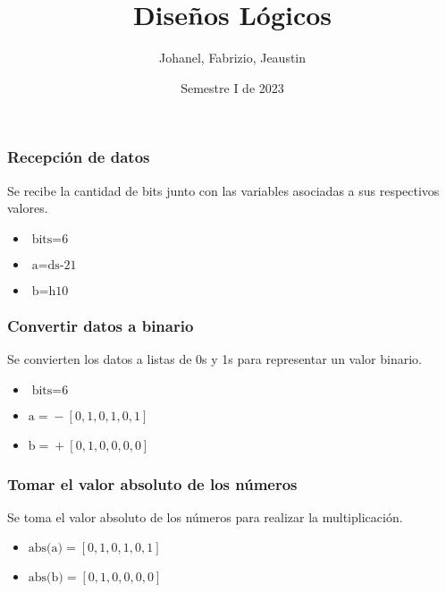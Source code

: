 \documentclass{beamer}
\title{Diseños Lógicos}
\author{Johanel, Fabrizio, Jeaustin}
\institute{Tecnológico de Costa Rica}
\date{Semestre I de 2023}
\begin{document}
\begin{frame}
\frametitle{Recepción de datos}
Se recibe la cantidad de bits junto con las variables asociadas a sus respectivos valores.
\begin{itemize}
\item $\text{bits} = \text{6}$
\item $\text{a} = \text{ds-21}$
\item $\text{b} = \text{h10}$
\end{itemize}
\end{frame}
\begin{frame}
\frametitle{Convertir datos a binario}
Se convierten los datos a listas de 0s y 1s para representar un valor binario.
\begin{itemize}
\item $\text{bits} = \text{6}$
\item $\text{a} = \text{} - [0, 1, 0, 1, 0, 1]$
\item $\text{b} = \text{} + [0, 1, 0, 0, 0, 0]$
\end{itemize}
\end{frame}
\begin{frame}
\frametitle{Tomar el valor absoluto de los números}
Se toma el valor absoluto de los números para realizar la multiplicación.
\begin{itemize}
\item $\text{abs(a)} = [0, 1, 0, 1, 0, 1]$
\item $\text{abs(b)} = [0, 1, 0, 0, 0, 0]$
\end{itemize}
\end{frame}

\begin{frame}
\maketitle
{}
\end{frame}
\end{document}
